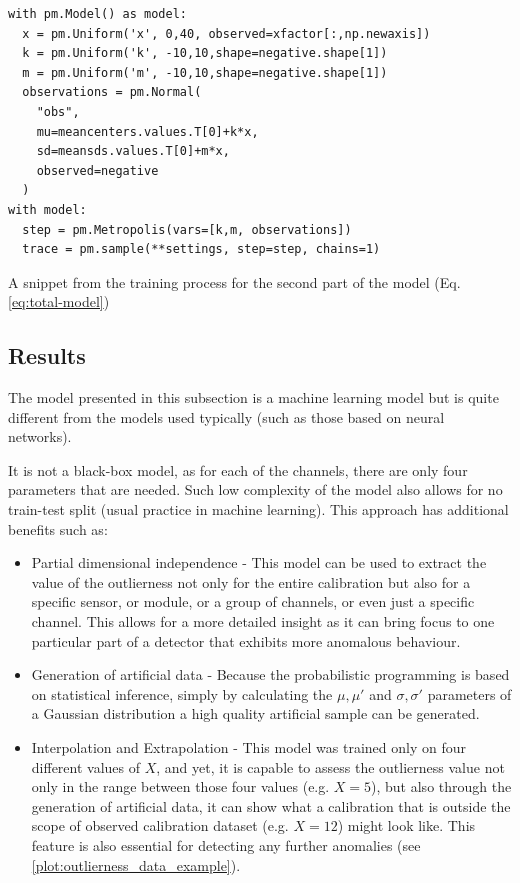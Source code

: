 \begin{listing}[H]
\begin{verbatim}
with pm.Model() as model:
  x = pm.Uniform('x', 0,40, observed=xfactor[:,np.newaxis])
  k = pm.Uniform('k', -10,10,shape=negative.shape[1])
  m = pm.Uniform('m', -10,10,shape=negative.shape[1])
  observations = pm.Normal(
    "obs",
    mu=meancenters.values.T[0]+k*x,
    sd=meansds.values.T[0]+m*x,
    observed=negative
  )
with model:
  step = pm.Metropolis(vars=[k,m, observations])
  trace = pm.sample(**settings, step=step, chains=1)
\end{verbatim}
\caption{A snippet from the training process for the second part of the model (Eq. \ref{eq:total-model})}
\label{listing:calina2}
\end{listing}

\subsection{Results}

The model presented in this subsection is a machine learning model but is quite different from the models used typically (such as those based on neural networks).

It is not a black-box model, as for each of the channels, there are only four parameters that are needed. Such low complexity of the model also allows for no train-test split (usual practice in machine learning).
This approach has additional benefits such as:

\begin{itemize}
  \item Partial dimensional independence - This model can be used to extract the value of the outlierness not only for the entire calibration but also for a specific sensor, or module, or a group of channels, or even just a specific channel. This allows for a more detailed insight as it can bring focus to one particular part of a detector that exhibits more anomalous behaviour.
  \item Generation of artificial data - Because the probabilistic programming is based on statistical inference, simply by calculating the $\mu, \mu\prime$ and $\sigma, \sigma\prime$ parameters of a Gaussian distribution a high quality artificial sample can be generated.
  \item Interpolation and Extrapolation - This model was trained only on four different values of $X$, and yet, it is capable to assess the outlierness value not only in the range between those four values (e.g. $X=5$), but also through the generation of artificial data, it can show what a calibration that is outside the scope of observed calibration dataset (e.g. $X=12$) might look like. This feature is also essential for detecting any further anomalies (see \ref{plot:outlierness_data_example}).
\end{itemize}


